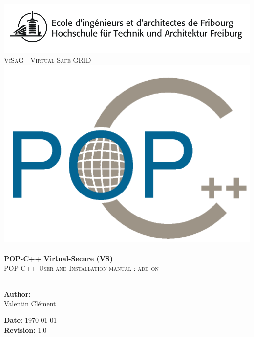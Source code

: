 
\begin{titlepage}
 
\begin{center}
\includegraphics[scale=0.3]{logo_eif.png}\\[1.5cm]
\textsc{\LARGE ViSaG - Virtual Safe GRID}\\[1.5cm]

\includegraphics[scale=0.3]{pic/logo_pop.png}\\[2cm]


\HRule \\[1cm]
{ \huge \bfseries POP-C++ Virtual-Secure (VS)}\\[0.5cm]
\textsc{\LARGE POP-C++ User and Installation manual : add-on}\\[1cm]
 
\HRule \\[5cm]
 
\begin{minipage}{0.4\textwidth}
\begin{flushleft} \large
\textbf{Author:}\\
Valentin Clément
\end{flushleft}
\end{minipage}
\begin{minipage}{0.4\textwidth}
\begin{flushright} \large
\textbf{Date:} \today \\

\textbf{Revision:} 1.0
\end{flushright}
\end{minipage}
 
\vfill
  
\end{center}
 
\end{titlepage}
